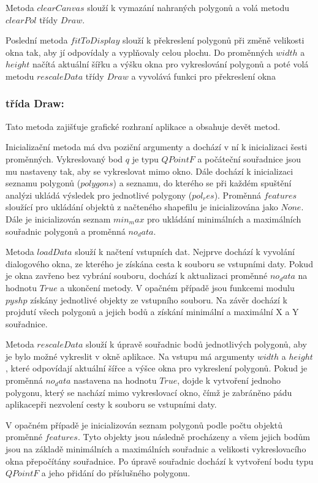 \documentclass[15pt]{article}
\begin{document}
\begin{spacing}{1.5}
\noindent Metoda $clearCanvas$ slouží k vymazání nahraných polygonů a volá metodu $clearPol$ třídy $Draw$. 

\noindent Poslední metoda $fitToDisplay$ slouží k překreslení polygonů při změně velikosti okna tak, aby jí odpovídaly a vyplňovaly celou plochu. Do proměnných $width$ a $height$ načítá aktuální šířku a výšku okna pro vykreslování polygonů a poté volá metodu $rescaleData$ třídy $Draw$ a vyvolává funkci pro překreslení okna

\subsubsection*{třída Draw:}
Tato metoda zajišťuje grafické rozhraní aplikace a obsahuje devět metod.

Inicializační metoda má dva poziční argumenty a dochází v ní k inicializaci šesti proměnných. Vykreslovaný bod  $q$ je typu $QPointF$ a počáteční souřadnice jsou mu nastaveny tak, aby se vykreslovat mimo okno. Dále dochází k inicializaci seznamu polygonů ($polygons$) a seznamu, do kterého se při každém spuštění analýzi ukládá výsledek pro jednotlivé polygony ($pol_res$). Proměnná $features$ sloužící pro ukládání objektů z načteného shapefilu je inicializována jako $None$. Dále je inicializován seznam $min_max$ pro ukládání minimálních a maximálních souřadnic polygonů a proměnná $no_data$.

\noindent Metoda $loadData$ slouží k načtení vstupních dat. Nejprve dochází k vyvolání dialogového okna, ze kterého je získána cesta k souboru se vstupními daty. Pokud je okna zavřeno bez vybrání souboru, dochází k aktualizaci proměnné $no_data$ na hodnotu $True$ a ukončení metody. V opačném případě jsou funkcemi modulu $pyshp$ získány jednotlivé objekty ze vstupního souboru. Na závěr dochází k projdutí všech polygonů a jejich bodů a získání minimální a maximální X a Y souřadnice.

\noindent Metoda $rescaleData$ slouží k úpravě souřadnic bodů jednotlivých polygonů, aby je bylo možné vykreslit v okně aplikace. Na vstupu má argumenty $width$ a $height$, které odpovídají aktuální šířce a výšce okna pro vykreslení polygonů. Pokud je proměnná $no_data$ nastavena na hodnotu $True$, dojde k vytvoření jednoho polygonu, který se nachází mimo vykreslovací okno, čímž je zabráněno pádu aplikacepři nezvolení cesty k souboru se vstupními daty. 

V opačném případě je inicializován seznam polygonů podle počtu objektů proměnné $features$. Tyto objekty jsou následně procházeny a všem jejich bodům jsou na základě minimálních a maximálních souřadnic a velikosti vykreslovacího okna přepočítány souřadnice. Po úpravě souřadnic dochází k vytvoření bodu typu $QPointF$ a jeho přidání do příslušného polygonu.


\end{spacing}
\end{document}
